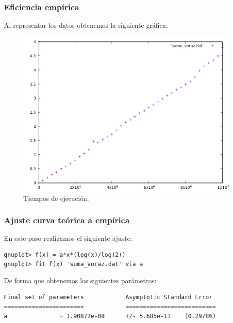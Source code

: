  
\subsubsection{Eficiencia empírica}

Al representar los datos obtenemos la siguiente gráfica:

\begin{figure}[H]
    \begin{center}
        \includegraphics[scale=0.7]{imagenes/suma_voraz.png}
        \caption{Tiempos de ejecución.}
        \label{fig2}
    \end{center}
\end{figure}

\subsubsection{Ajuste curva teórica a empírica}

En este paso realizamos el siguiente ajuste:
\begin{shaded*}
\begin{verbatim}
gnuplot> f(x) = a*x*(log(x)/log(2))
gnuplot> fit f(x) 'suma_voraz.dat' via a

\end{verbatim}
\end{shaded*}

De forma que obtenemos los siguientes parámetros:

\begin{shaded*}
\begin{verbatim}
Final set of parameters            Asymptotic Standard Error
=======================            ==========================
a               = 1.90872e-08      +/- 5.685e-11    (0.2978%)
\end{verbatim}
\end{shaded*}

